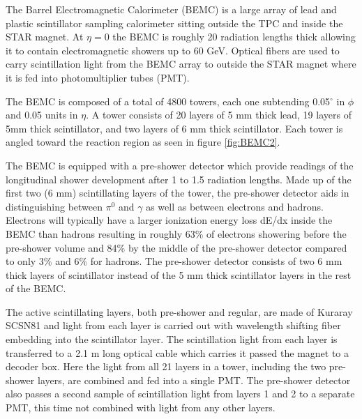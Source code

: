 \documentclass[abstract = on,listof=totoc, bibliography=totoc]{scrreprt}
\begin{document}
The Barrel Electromagnetic Calorimeter (BEMC) is a large array of lead and plastic scintillator sampling calorimeter sitting outside the TPC and inside the STAR magnet. At $\eta = 0$ the BEMC is roughly 20 radiation lengths thick allowing it to contain electromagnetic showers up to 60 GeV. Optical fibers are used to carry scintillation light from the BEMC array to outside the STAR magnet where it is fed into photomultiplier tubes (PMT).

The BEMC is composed of a total of 4800 towers, each one subtending 0.05$^\circ$ in $\phi$ and 0.05 units in $\eta$. A tower consists of 20 layers of 5 mm thick lead, 19 layers of 5mm thick scintillator, and two layers of 6 mm thick scintillator. Each tower is angled toward the reaction region as seen in figure \ref{fig:BEMC2}.  

The BEMC is equipped with a pre-shower detector which provide readings of the longitudinal shower development after 1 to 1.5 radiation lengths. Made up of the first two (6 mm) scintillating layers of the tower, the pre-shower detector aids in distinguishing between $\pi^0$ and $\gamma$ as well as between electrons and hadrons. Electrons will typically have a larger ionization energy loss dE/dx inside the BEMC than hadrons resulting in roughly 63\% of electrons showering before the pre-shower volume and 84\% by the middle of the pre-shower detector compared to only 3\% and 6\% for hadrons. The pre-shower detector consists of two 6 mm thick layers of scintillator instead of the 5 mm thick scintillator layers in the rest of the BEMC. 

The active scintillating layers, both pre-shower and regular, are made of Kuraray SCSN81 and light from each layer is carried out with wavelength shifting fiber embedding into the scintillator layer. The scintillation light from each layer is transferred to a 2.1 m long optical cable which carries it passed the magnet to a decoder box. Here the light from all 21 layers in a tower, including the two pre-shower layers, are combined and fed into a single PMT. The pre-shower detector also passes a second sample of scintillation light from layers 1 and 2 to a separate PMT, this time not combined with light from any other layers.  
\end{document}
